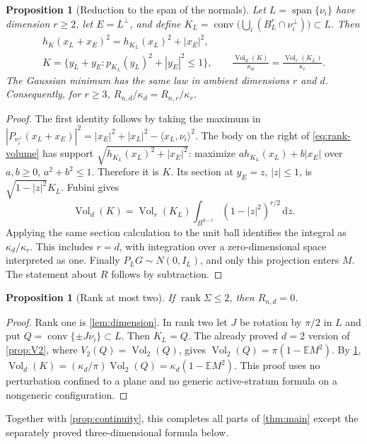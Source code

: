 \documentclass[10pt,reqno]{amsart}
\newtheorem{proposition}[theorem]{Proposition}
\theoremstyle{definition}
\theoremstyle{remark}
\newcommand{\E}{\mathbb E}
\newcommand{\conv}{\operatorname{conv}}
\newcommand{\Vol}{\operatorname{Vol}}
\newcommand{\rank}{\operatorname{rank}}
\newcommand{\Span}{\operatorname{span}}
\newcommand{\dd}{\,\mathrm d}
\newcommand{\ip}[2]{\langle #1,#2\rangle}
\begin{document}
\begin{proposition}[Reduction to the span of the normals]\label{prop:rank-reduction}
Let $L=\Span\{\nu_i\}$ have dimension $r\ge2$, let $E=L^\perp$, and define
$K_L=\conv\bigl(\bigcup_i(B^r_L\cap\nu_i^\perp)\bigr)\subset L$.
Then
\begin{gather}
h_K(x_L+x_E)^2=h_{K_L}(x_L)^2+|x_E|^2,\label{eq:rank-support}\\
K=\{y_L+y_E:p_{K_L}(y_L)^2+|y_E|^2\le1\},\qquad
\frac{\Vol_d(K)}{\kappa_d}=\frac{\Vol_r(K_L)}{\kappa_r}.
\label{eq:rank-volume}
\end{gather}
The Gaussian minimum has the same law in ambient dimensions $r$ and $d$. Consequently, for $r\ge3$, $R_{n,d}/\kappa_d=R_{n,r}/\kappa_r$.
\end{proposition}
\begin{proof}
The first identity follows by taking the maximum in
$|P_{\nu_i^\perp}(x_L+x_E)|^2=|x_E|^2+|x_L|^2-\ip{x_L}{\nu_i}^2$.
The body on the right of \eqref{eq:rank-volume} has support
$\sqrt{h_{K_L}(x_L)^2+|x_E|^2}$: maximize $a h_{K_L}(x_L)+b|x_E|$ over $a,b\ge0$, $a^2+b^2\le1$. Therefore it is $K$.
Its section at $y_E=z$, $|z|\le1$, is $\sqrt{1-|z|^2}K_L$. Fubini gives
\[
\Vol_d(K)=\Vol_r(K_L)\int_{B^{d-r}}(1-|z|^2)^{r/2}\dd z.
\]
Applying the same section calculation to the unit ball identifies the integral as $\kappa_d/\kappa_r$. This includes $r=d$, with integration over a zero-dimensional space interpreted as one. Finally $P_LG\sim N(0,I_L)$, and only this projection enters $M$. The statement about $R$ follows by subtraction.
\end{proof}

\begin{proposition}[Rank at most two]\label{prop:rank-two}
If $\rank\Sigma\le2$, then $R_{n,d}=0$.
\end{proposition}
\begin{proof}
Rank one is \cref{lem:dimension}. In rank two let $J$ be rotation by $\pi/2$ in $L$ and put $Q=\conv\{\pm J\nu_i\}\subset L$. Then $K_L=Q$.
The already proved $d=2$ version of \cref{prop:V2}, where $V_2(Q)=\Vol_2(Q)$, gives $\Vol_2(Q)=\pi(1-\E M^2)$. By \cref{prop:rank-reduction},
$\Vol_d(K)=(\kappa_d/\pi)\Vol_2(Q)=\kappa_d(1-\E M^2)$.
This proof uses no perturbation confined to a plane and no generic active-stratum formula on a nongeneric configuration.
\end{proof}
Together with \cref{prop:continuity}, this completes all parts of \cref{thm:main} except the separately proved three-dimensional formula below.
\end{document}
